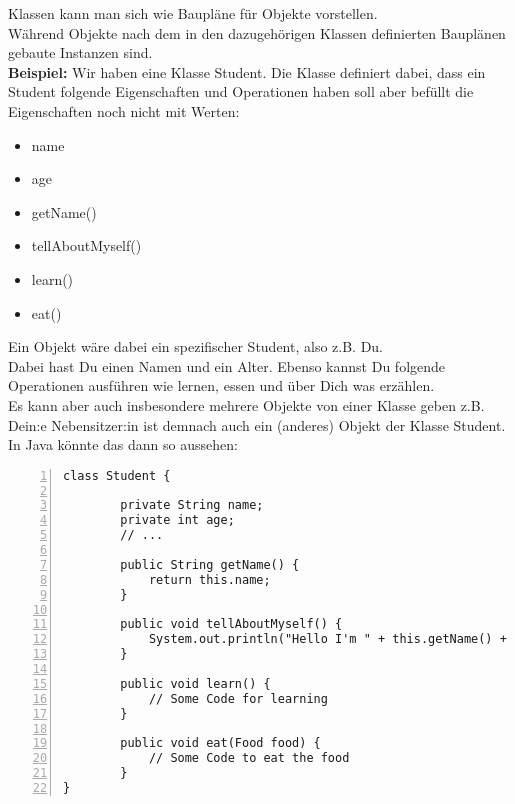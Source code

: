 


\begin{Infobox}
    Klassen kann man sich wie Baupläne für Objekte vorstellen.\\
    Während Objekte nach dem in den dazugehörigen Klassen definierten Bauplänen gebaute Instanzen sind.\\

    \textbf{Beispiel:} Wir haben eine Klasse Student.
    Die Klasse definiert dabei, dass ein Student folgende Eigenschaften und Operationen haben soll aber befüllt die Eigenschaften noch nicht mit Werten:

    \begin{itemize}
        \item name
        \item age
        \item getName()
        \item tellAboutMyself()
        \item learn()
        \item eat()
    \end{itemize}

    Ein Objekt wäre dabei ein spezifischer Student, also z.B. Du.\\
Dabei hast Du einen Namen und ein Alter.
Ebenso kannst Du folgende Operationen ausführen wie lernen, essen und über Dich was erzählen.\\
Es kann aber auch insbesondere mehrere Objekte von einer Klasse geben z.B. Dein:e Nebensitzer:in ist demnach auch ein (anderes) Objekt der Klasse Student.\\
In Java könnte das dann so aussehen:
    \begin{lstlisting}[numbers=left,xleftmargin=2em,frame=single,framexleftmargin=1.5em]
class Student {

        private String name;
        private int age;
        // ...

        public String getName() {
            return this.name;
        }

        public void tellAboutMyself() {
            System.out.println("Hello I'm " + this.getName() + ". I'm " + age + " old!";
        }

        public void learn() {
            // Some Code for learning
        }

        public void eat(Food food) {
            // Some Code to eat the food
        }
}

    \end{lstlisting}
\end{Infobox}

